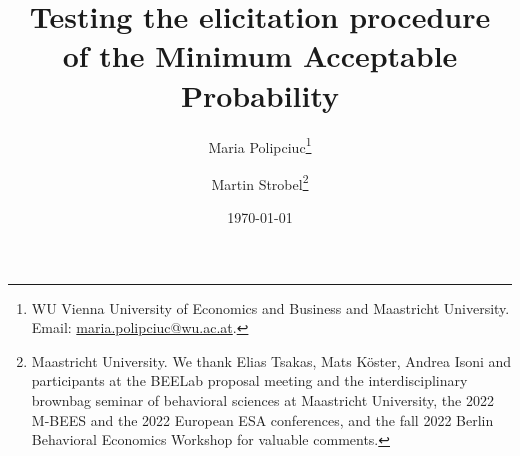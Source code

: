 \makeatletter
\def\@seccntformat#1{\@ifundefined{#1@cntformat}%
   {\csname the#1\endcsname\quad}  %
   {\csname #1@cntformat\endcsname}%
}
\let\oldappendix\appendix %
\renewcommand\appendix{%
    \oldappendix
    \newcommand{\section@cntformat}{\appendixname~\thesection\quad}
}


\title{Testing the elicitation procedure \\ of the Minimum Acceptable Probability}
\author{Maria Polipciuc\thanks{WU Vienna University of Economics and Business and Maastricht University. Email: \url{maria.polipciuc@wu.ac.at}.} \and Martin Strobel\thanks{Maastricht University. We thank Elias Tsakas, Mats K\"{o}ster, Andrea Isoni and participants at the BEELab proposal meeting and the interdisciplinary brownbag seminar of behavioral sciences at Maastricht University, the 2022 M-BEES and the 2022 European ESA conferences, and the fall 2022 Berlin Behavioral Economics Workshop for valuable comments.}}
\date{\today	\vspace{1cm}}
\titlepage



